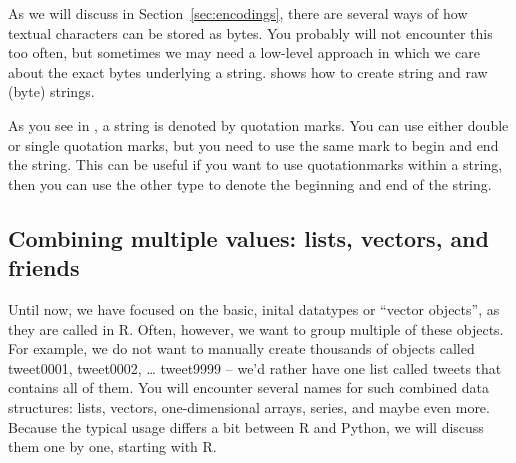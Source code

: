
As we will discuss in Section~\ref{sec:encodings}, there are several
ways of how textual characters can be stored as bytes. You probably
will not encounter this too often, but sometimes we may need a
low-level approach in which we care about the exact bytes underlying a
string.  shows how to create string and raw (byte)
strings.

As you see in , a string is denoted by quotation
marks. You can use either double or single quotation marks, but you
need to use the same mark to begin and end the string. This can be
useful if you want to use quotationmarks within a string, then you can
use the other type to denote the beginning and end of the string.



\subsection{Combining multiple values: lists, vectors, and friends}

Until now, we have focused on the basic, inital datatypes or ``vector
objects'', as they are called in R.  Often, however, we want to group
multiple of these objects. For example, we do not want to manually
create thousands of objects called tweet0001, tweet0002, \ldots
tweet9999 -- we'd rather have one list called tweets that contains all
of them. You will encounter several names for such combined data
structures: lists, vectors, one-dimensional arrays, series, and maybe
even more. Because the typical usage differs a bit between R and
Python, we will discuss them one by one, starting with R.


